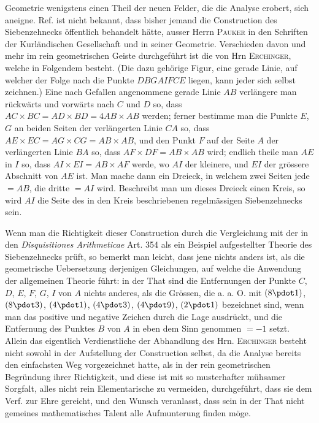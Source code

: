 Geometrie wenigstens einen Theil der neuen Felder, die die Analyse erobert, sich aneigne. Ref. ist nicht bekannt, dass bisher jemand die Construction des Siebenzehnecks öffentlich behandelt hätte, ausser Herrn \textsc{Pauker} in den Schriften der Kurländischen Gesellschaft und in seiner Geometrie. Verschieden davon und mehr im rein geometrischen Geiste durchgeführt ist die von Hrn \textsc{Erchinger}, welche in Folgendem besteht. (Die dazu gehörige Figur, eine gerade Linie, auf welcher der Folge nach die Punkte $DBGAIFCE$ liegen, kann jeder sich selbst zeichnen.) Eine nach Gefallen angenommene gerade Linie $AB$ verlängere man rückwärts und vorwärts nach $C$ und $D$ so, dass $AC\times BC=AD\times BD=4AB\times AB$ werden; ferner bestimme man die Punkte $E$, $G$ an beiden Seiten der verlängerten Linie $CA$ so, dass $AE\times EC=AG\times CG=AB\times AB$, und den Punkt $F$ auf der Seite $A$ der verlängerten Linie $BA$ so, dass $AF\times DF=AB\times AB$ wird; endlich theile man $AE$ in $I$ so, dass $AI\times EI=AB\times AF$ werde, wo $AI$ der kleinere, und $EI$ der grössere Abschnitt von $AE$ ist. Man mache dann ein Dreieck, in welchem zwei Seiten jede $=AB$, die dritte $=AI$ wird. Beschreibt man um dieses Dreieck einen Kreis, so wird $AI$ die Seite des in den Kreis beschriebenen regelmässigen Siebenzehnecks sein.

Wenn man die Richtigkeit dieser Construction durch die Vergleichung mit der in den \emph{Disquisitiones Arithmeticae} Art. 354 als ein Beispiel aufgestellter Theorie des Siebenzehnecks prüft, so bemerkt man leicht, dass jene nichts anders ist, als die geometrische Uebersetzung derjenigen Gleichungen, auf welche die Anwendung der allgemeinen Theorie führt: in der That sind die Entfernungen der Punkte $C$, $D$, $E$, $F$, $G$, $I$ von $A$ nichts anderes, als die Grössen, die a. a. O. mit $(8\pdot1)$, $(8\pdot3)$, $(4\pdot1)$, $(4\pdot3)$, $(4\pdot9)$, $(2\pdot1)$ bezeichnet sind, wenn man das positive und negative Zeichen durch die Lage ausdrückt, und die Entfernung des Punktes $B$ von $A$ in eben dem Sinn genommen $=-1$ setzt. Allein das eigentlich Verdienstliche der Abhandlung des Hrn. \textsc{Erchinger} besteht nicht sowohl in der Aufstellung der Construction selbst, da die Analyse bereits den einfachsten Weg vorgezeichnet hatte, als in der rein geometrischen Begründung ihrer Richtigkeit, und diese ist mit so musterhafter mühsamer Sorgfalt, alles nicht rein Elementarische zu vermeiden, durchgeführt, dass sie dem Verf. zur Ehre gereicht, und den Wunsch veranlasst, dass sein in der That nicht gemeines mathematisches Talent alle Aufmunterung finden möge.
